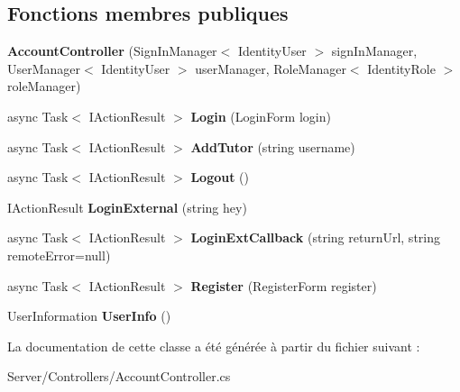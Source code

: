 \subsection*{Fonctions membres publiques}
\begin{DoxyCompactItemize}
\item 
\mbox{\label{class_mediwatch_1_1_server_1_1_controllers_1_1_account_controller_ad0ec04a26c733fb1f349f7486ea820b4}} 
{\bfseries Account\+Controller} (Sign\+In\+Manager$<$ Identity\+User $>$ sign\+In\+Manager, User\+Manager$<$ Identity\+User $>$ user\+Manager, Role\+Manager$<$ Identity\+Role $>$ role\+Manager)
\item 
\mbox{\label{class_mediwatch_1_1_server_1_1_controllers_1_1_account_controller_a0eca1869d875e9cdfbc6e9bc4540ae41}} 
async Task$<$ I\+Action\+Result $>$ {\bfseries Login} (Login\+Form login)
\item 
\mbox{\label{class_mediwatch_1_1_server_1_1_controllers_1_1_account_controller_ab2521eccf3ab6c752eb5e414f6463528}} 
async Task$<$ I\+Action\+Result $>$ {\bfseries Add\+Tutor} (string username)
\item 
\mbox{\label{class_mediwatch_1_1_server_1_1_controllers_1_1_account_controller_a177b908ddf5a0c4ec5e3269e4cbcb252}} 
async Task$<$ I\+Action\+Result $>$ {\bfseries Logout} ()
\item 
\mbox{\label{class_mediwatch_1_1_server_1_1_controllers_1_1_account_controller_a7f1a46f59d4b8fff4e948992fcf9f605}} 
I\+Action\+Result {\bfseries Login\+External} (string hey)
\item 
\mbox{\label{class_mediwatch_1_1_server_1_1_controllers_1_1_account_controller_ab3cb65a34f1dd5de150ebf5b956ff414}} 
async Task$<$ I\+Action\+Result $>$ {\bfseries Login\+Ext\+Callback} (string return\+Url, string remote\+Error=null)
\item 
\mbox{\label{class_mediwatch_1_1_server_1_1_controllers_1_1_account_controller_a0a0cf410c96bdacc714cb77c1d52861d}} 
async Task$<$ I\+Action\+Result $>$ {\bfseries Register} (Register\+Form register)
\item 
\mbox{\label{class_mediwatch_1_1_server_1_1_controllers_1_1_account_controller_a35118ac6cb00d088863119bf4cbdc30f}} 
User\+Information {\bfseries User\+Info} ()
\end{DoxyCompactItemize}


La documentation de cette classe a été générée à partir du fichier suivant \+:\begin{DoxyCompactItemize}
\item 
Server/\+Controllers/Account\+Controller.\+cs\end{DoxyCompactItemize}

